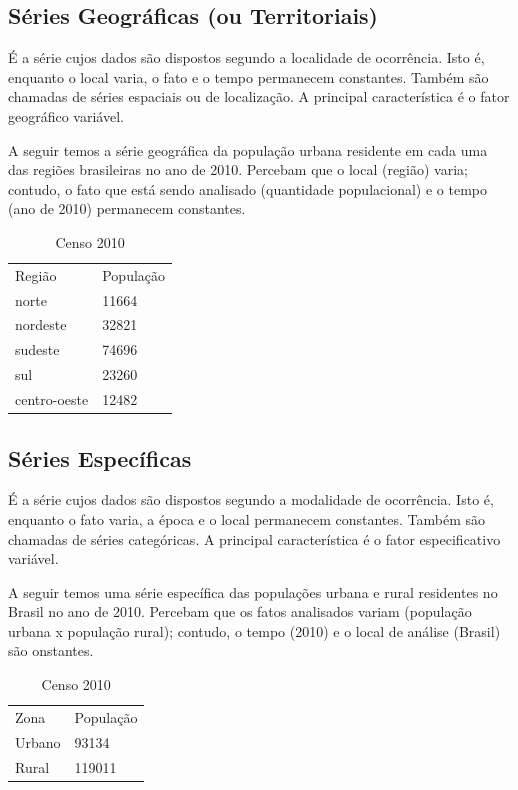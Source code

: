 \subsection{Séries Geográficas (ou Territoriais)}
É a série cujos dados são dispostos segundo a localidade de ocorrência. Isto é, enquanto o local varia, o fato e o tempo permanecem constantes. Também são chamadas de séries espaciais ou de localização. A principal característica é o fator geográfico variável.

A seguir temos a série geográfica da população urbana residente em cada uma das regiões brasileiras no ano de 2010. Percebam que o local (região) varia; contudo, o fato que está sendo analisado (quantidade populacional) e o tempo (ano de 2010) permanecem constantes.


\begin{table}[H]
    \centering
    \begin{tabular}{ll}
        \toprule
      Região    &       População\\
      norte         &   11664\\
      nordeste      &   32821\\
      sudeste       &   74696\\
      sul           &   23260\\
      centro-oeste  &   12482\\
        \midrule
        \bottomrule
          \end{tabular}
    \caption{Censo 2010}
\end{table}

\subsection{Séries Específicas}

É a série cujos dados são dispostos segundo a modalidade de ocorrência. Isto é, enquanto o fato varia, a época e o local permanecem constantes. Também são chamadas de séries categóricas. A principal característica é o fator especificativo variável.

A seguir temos uma série específica das populações urbana e rural residentes no Brasil no ano de 2010. Percebam que os fatos analisados variam (população urbana x população rural); contudo, o tempo (2010) e o local de análise (Brasil) são onstantes.

\begin{table}[H]
    \centering
    \begin{tabular}{ll}
        \toprule
      Zona    &   População\\
      Urbano  &   93134\\
      Rural   &   119011\\
         \midrule
        \bottomrule
          \end{tabular}
    \caption{Censo 2010}
\end{table}


